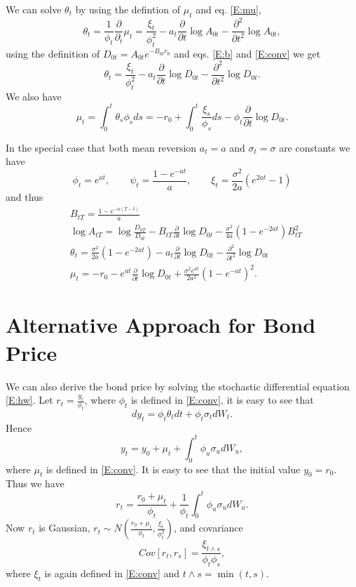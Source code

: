 We can solve $\theta_t$ by using the defintion of $\mu_t$ and eq. \ref{E:mu},
\[
  \theta_t = \frac{1}{\phi_t} \frac{\partial}{\partial_t} \mu_t
           = \frac{\xi_t}{\phi_t^2} 
             - a_t \frac{\partial}{\partial t} \log{A_{0t}}
             - \frac{\partial^2}{\partial t^2} \log{A_{0t}},
\]
using the definition of $D_{0t}=A_{0t} e^{-B_{0t}r_0}$ and eqs. \ref{E:b} and
\ref{E:conv} we get
\begin{equation} \label{E:theta}
  \theta_t = \frac{\xi_t}{\phi_t^2} 
             - a_t \frac{\partial}{\partial t} \log{D_{0t}}
             - \frac{\partial^2}{\partial t^2} \log{D_{0t}}.
\end{equation}
We also have
\begin{equation}
  \mu_t = \int_0^t \theta_s \phi_s ds
    = - r_0 + \int_0^t \frac{\xi_s}{\phi_s} ds 
      - \phi_t \frac{\partial}{\partial t} \log{D_{0t}}.
\end{equation}

In the special case that both mean reversion $a_t=a$ and $\sigma_t=\sigma$ are
constants we have
\[
  \phi_t = e^{at},   \qquad
  \psi_t = \frac{1-e^{-at}}{a}, \qquad
  \xi_t = \frac{\sigma^2}{2a} (e^{2at} -1)   
\]
and thus
\begin{align}
  &B_{tT} = \frac{1-e^{-a(T-t)}}{a}  \\
  &\log A_{tT} = \log \frac{D_{0T}}{D_{0t}} 
                - B_{tT} \frac{\partial}{\partial t} \log D_{0t} 
                - \frac{\sigma^2}{4a} \left( 1-e^{-2at} \right) B_{tT}^2
                \\
  &\theta_t = \frac{\sigma^2}{2a} \left( 1-e^{-2at} \right) 
             - a_t \frac{\partial}{\partial t} \log{D_{0t}}
             - \frac{\partial^2}{\partial t^2} \log{D_{0t}}  \\
  &\mu_t = -r_0 - e^{at} \frac{\partial}{\partial t} \log{D_{0t}}
          + \frac{\sigma^2 e^{at}}{2a^2} (1-e^{-at})^2.
\end{align}






\section{Alternative Approach for Bond Price}
We can also derive the bond price by solving the stochastic differential
equation \ref{E:hw}. Let $r_t=\frac{y_t}{\phi_t}$, where $\phi_t$ is defined 
in \ref{E:conv}, it is easy to see that
\[
  dy_t = \phi_t \theta_t dt + \phi_t \sigma_t dW_t.
\]
Hence
\[
  y_t = y_0 + \mu_t + \int_0^t \phi_u \sigma_u dW_u,
\]
where $\mu_t$ is defined in \ref{E:conv}.
It is easy to see that the initial value $y_0=r_0$. Thus we have
\[
  r_t = \frac{r_0+\mu_t}{\phi_t} 
       + \frac{1}{\phi_t} \int_0^t \phi_u \sigma_u dW_u.
\]
Now $r_t$ is Gaussian, 
$r_t\sim N(\frac{r_0+\mu_t}{\phi_t}, \frac{\xi_t}{\phi_t^2})$, and covariance
\[
  Cov[r_t,r_s] = \frac{\xi_{t\wedge s}}{\phi_t \phi_s},
\]
where $\xi_t$ is again defined in \ref{E:conv} and $t\wedge s=\min(t,s)$.


